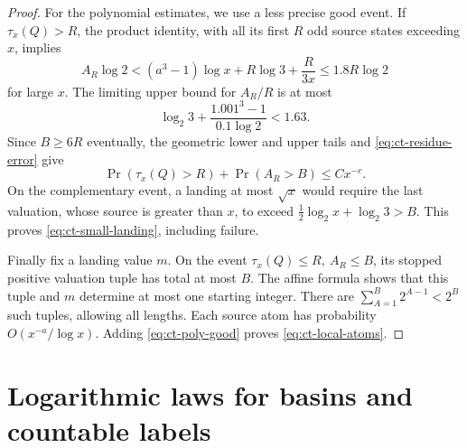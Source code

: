 \documentclass[11pt,a4paper]{article}
\begin{document}
\begin{proof}
For the polynomial estimates, we use a less precise good event.
If \(\tau_x(Q)>R\), the product identity, with all its first \(R\)
odd source states exceeding \(x\), implies
\[
 A_R\log2
 <(a^3-1)\log x+R\log3+\frac{R}{3x}
 \le1.8R\log2
\]
for large \(x\). The limiting upper bound for \(A_R/R\) is at most
\[
 \log_2 3+\frac{1.001^3-1}{0.1\log2}<1.63.
\]
Since \(B\ge6R\) eventually, the geometric lower and upper tails
and \eqref{eq:ct-residue-error} give
\begin{equation}\label{eq:ct-poly-good}
 \Pr(\tau_x(Q)>R)+\Pr(A_R>B)\le Cx^{-c}.
\end{equation}
On the complementary event, a landing at most \(\sqrt x\) would
require the last valuation, whose source is greater than \(x\),
to exceed \(\frac12\log_2x+\log_2 3>B\). This proves
\eqref{eq:ct-small-landing}, including failure.

Finally fix a landing value \(m\). On the event
\(\tau_x(Q)\le R,\ A_R\le B\), its stopped positive valuation
tuple has total at most \(B\). The affine formula shows that this
tuple and \(m\) determine at most one starting integer.
There are \(\sum_{A=1}^B2^{A-1}<2^B\) such tuples, allowing all
lengths. Each source atom has probability
\(O(x^{-a}/\log x)\). Adding \eqref{eq:ct-poly-good} proves
\eqref{eq:ct-local-atoms}.
\end{proof}

\section{Logarithmic laws for basins and countable labels}
\end{document}
